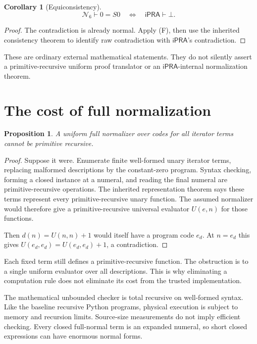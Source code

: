 \documentclass[11pt]{article}
\newtheorem{proposition}[theorem]{Proposition}
\newtheorem{corollary}[theorem]{Corollary}
\theoremstyle{definition}
\newcommand{\ipra}{\ensuremath{\mathsf{iPRA}}}
\newcommand{\Six}{\ensuremath{\mathcal N_6}}
\begin{document}
\begin{corollary}[Equiconsistency]
\[
 \Six\vdash0=S0\quad\Longleftrightarrow\quad\ipra\vdash\bot.
\]
\end{corollary}

\begin{proof}
The contradiction is already normal. Apply (F), then use the inherited
consistency theorem to identify raw contradiction with
\ipra's contradiction.
\end{proof}

These are ordinary external mathematical statements. They do not
silently assert a primitive-recursive uniform proof translator or an
\ipra-internal normalization theorem.

\section{The cost of full normalization}
\label{sec:cost}

\begin{proposition}
A uniform full normalizer over codes for all iterator terms cannot
be primitive recursive.
\end{proposition}

\begin{proof}
Suppose it were. Enumerate finite well-formed unary iterator terms,
replacing malformed descriptions by the constant-zero program.
Syntax checking, forming a closed instance at a numeral, and reading
the final numeral are primitive-recursive operations.
The inherited representation theorem says these terms represent
every primitive-recursive unary function.
The assumed normalizer would therefore give a primitive-recursive
universal evaluator $U(e,n)$ for those functions.

Then $d(n)=U(n,n)+1$ would itself have a program code $e_d$.
At $n=e_d$ this gives
$U(e_d,e_d)=U(e_d,e_d)+1$, a contradiction.
\end{proof}

Each fixed term still defines a primitive-recursive function. The
obstruction is to a single uniform evaluator over all descriptions.
This is why eliminating a computation rule does not eliminate its
cost from the trusted implementation.

The mathematical unbounded checker is total recursive on well-formed
syntax. Like the baseline recursive Python programs, physical execution
is subject to memory and recursion limits. Source-size measurements do
not imply efficient checking. Every closed full-normal term is an
expanded numeral, so short closed expressions can have enormous
normal forms.
\end{document}
